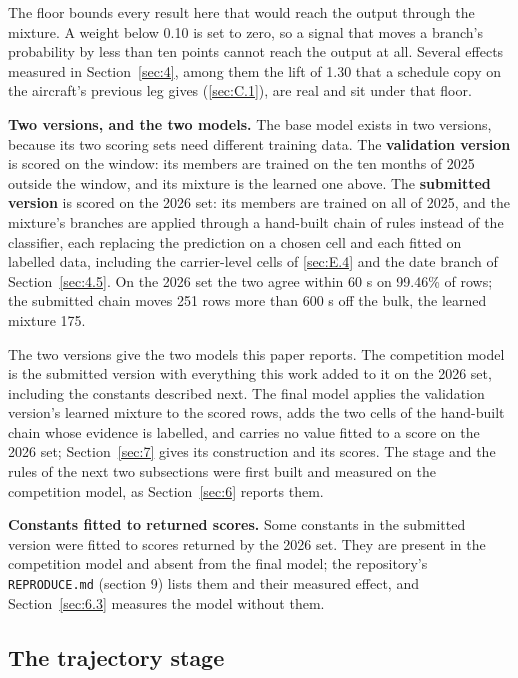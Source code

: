 \documentclass[
  manuscript=article,
  layout=preprint,
  year=2026,
  volume=x,
]{extra/joas}
\begin{document}
The floor bounds every result here that would reach the output through the mixture. A weight below 0.10 is set to zero, so a signal that moves a branch's probability by less than ten points cannot reach the output at all. Several effects measured in Section~\ref{sec:4}, among them the lift of 1.30 that a schedule copy on the aircraft's previous leg gives (\ref{sec:C.1}), are real and sit under that floor.

\textbf{Two versions, and the two models.} The base model exists in two versions, because its two scoring sets need different training data. The \textbf{validation version} is scored on the window: its members are trained on the ten months of 2025 outside the window, and its mixture is the learned one above. The \textbf{submitted version} is scored on the 2026 set: its members are trained on all of 2025, and the mixture's branches are applied through a hand-built chain of rules instead of the classifier, each replacing the prediction on a chosen cell and each fitted on labelled data, including the carrier-level cells of \ref{sec:E.4} and the date branch of Section~\ref{sec:4.5}. On the 2026 set the two agree within 60 s on 99.46\% of rows; the submitted chain moves 251 rows more than 600 s off the bulk, the learned mixture 175.

The two versions give the two models this paper reports. The competition model is the submitted version with everything this work added to it on the 2026 set, including the constants described next. The final model applies the validation version's learned mixture to the scored rows, adds the two cells of the hand-built chain whose evidence is labelled, and carries no value fitted to a score on the 2026 set; Section~\ref{sec:7} gives its construction and its scores. The stage and the rules of the next two subsections were first built and measured on the competition model, as Section~\ref{sec:6} reports them.

\textbf{Constants fitted to returned scores.} Some constants in the submitted version were fitted to scores returned by the 2026 set. They are present in the competition model and absent from the final model; the repository's \texttt{REPRODUCE.md} (section 9) lists them and their measured effect, and Section~\ref{sec:6.3} measures the model without them.

\subsection{The trajectory stage}\label{sec:5.2}
\end{document}
